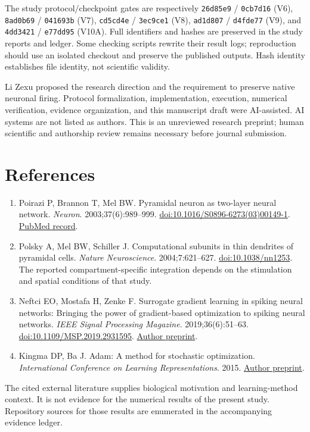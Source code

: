 \documentclass[
  10pt,
]{article}
\providecommand{\tightlist}{%
  \setlength{\itemsep}{0pt}\setlength{\parskip}{0pt}}
\begin{document}
The study protocol/checkpoint gates are respectively \texttt{26d85e9} /
\texttt{0cb7d16} (V6), \texttt{8ad0b69} / \texttt{041693b} (V7),
\texttt{cd5cd4e} / \texttt{3ec9ce1} (V8), \texttt{ad1d807} /
\texttt{d4fde77} (V9), and \texttt{4dd3421} / \texttt{e77dd95} (V10A).
Full identifiers and hashes are preserved in the study reports and
ledger. Some checking scripts rewrite their result logs; reproduction
should use an isolated checkout and preserve the published outputs. Hash
identity establishes file identity, not scientific validity.

Li Zexu proposed the research direction and the requirement to preserve
native neuronal firing. Protocol formalization, implementation,
execution, numerical verification, evidence organization, and this
manuscript draft were AI-assisted. AI systems are not listed as authors.
This is an unreviewed research preprint; human scientific and authorship
review remains necessary before journal submission.

\section{References}\label{references}

\begin{enumerate}
\def\labelenumi{\arabic{enumi}.}
\tightlist
\item
  Poirazi P, Brannon T, Mel BW. Pyramidal neuron as two-layer neural
  network. \emph{Neuron}. 2003;37(6):989--999.
  \href{https://doi.org/10.1016/S0896-6273(03)00149-1}{doi:10.1016/S0896-6273(03)00149-1}.
  \href{https://pubmed.ncbi.nlm.nih.gov/12670427/}{PubMed record}.
\item
  Polsky A, Mel BW, Schiller J. Computational subunits in thin dendrites
  of pyramidal cells. \emph{Nature Neuroscience}. 2004;7:621--627.
  \href{https://doi.org/10.1038/nn1253}{doi:10.1038/nn1253}. The
  reported compartment-specific integration depends on the stimulation
  and spatial conditions of that study.
\item
  Neftci EO, Mostafa H, Zenke F. Surrogate gradient learning in spiking
  neural networks: Bringing the power of gradient-based optimization to
  spiking neural networks. \emph{IEEE Signal Processing Magazine}.
  2019;36(6):51--63.
  \href{https://doi.org/10.1109/MSP.2019.2931595}{doi:10.1109/MSP.2019.2931595}.
  \href{https://arxiv.org/abs/1901.09948}{Author preprint}.
\item
  Kingma DP, Ba J. Adam: A method for stochastic optimization.
  \emph{International Conference on Learning Representations}. 2015.
  \href{https://arxiv.org/abs/1412.6980}{Author preprint}.
\end{enumerate}

The cited external literature supplies biological motivation and
learning-method context. It is not evidence for the numerical results of
the present study. Repository sources for those results are enumerated
in the accompanying evidence ledger.
\end{document}
